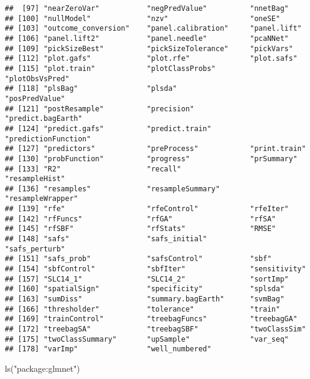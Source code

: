 \documentclass[
]{book}
\newenvironment{Shaded}{\begin{snugshade}}{\end{snugshade}}
\newcommand{\FunctionTok}[1]{\textcolor[rgb]{0.00,0.00,0.00}{#1}}
\newcommand{\NormalTok}[1]{#1}
\newcommand{\StringTok}[1]{\textcolor[rgb]{0.31,0.60,0.02}{#1}}
\begin{document}
\begin{verbatim}
##  [97] "nearZeroVar"           "negPredValue"          "nnetBag"              
## [100] "nullModel"             "nzv"                   "oneSE"                
## [103] "outcome_conversion"    "panel.calibration"     "panel.lift"           
## [106] "panel.lift2"           "panel.needle"          "pcaNNet"              
## [109] "pickSizeBest"          "pickSizeTolerance"     "pickVars"             
## [112] "plot.gafs"             "plot.rfe"              "plot.safs"            
## [115] "plot.train"            "plotClassProbs"        "plotObsVsPred"        
## [118] "plsBag"                "plsda"                 "posPredValue"         
## [121] "postResample"          "precision"             "predict.bagEarth"     
## [124] "predict.gafs"          "predict.train"         "predictionFunction"   
## [127] "predictors"            "preProcess"            "print.train"          
## [130] "probFunction"          "progress"              "prSummary"            
## [133] "R2"                    "recall"                "resampleHist"         
## [136] "resamples"             "resampleSummary"       "resampleWrapper"      
## [139] "rfe"                   "rfeControl"            "rfeIter"              
## [142] "rfFuncs"               "rfGA"                  "rfSA"                 
## [145] "rfSBF"                 "rfStats"               "RMSE"                 
## [148] "safs"                  "safs_initial"          "safs_perturb"         
## [151] "safs_prob"             "safsControl"           "sbf"                  
## [154] "sbfControl"            "sbfIter"               "sensitivity"          
## [157] "SLC14_1"               "SLC14_2"               "sortImp"              
## [160] "spatialSign"           "specificity"           "splsda"               
## [163] "sumDiss"               "summary.bagEarth"      "svmBag"               
## [166] "thresholder"           "tolerance"             "train"                
## [169] "trainControl"          "treebagFuncs"          "treebagGA"            
## [172] "treebagSA"             "treebagSBF"            "twoClassSim"          
## [175] "twoClassSummary"       "upSample"              "var_seq"              
## [178] "varImp"                "well_numbered"
\end{verbatim}

\begin{Shaded}
\begin{Highlighting}[]
\FunctionTok{ls}\NormalTok{(}\StringTok{"package:glmnet"}\NormalTok{)}
\end{Highlighting}
\end{Shaded}
\end{document}
